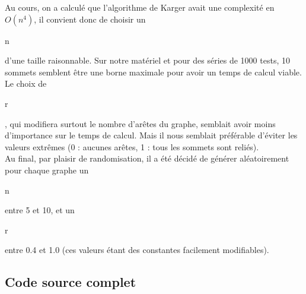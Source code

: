 \documentclass[a4paper,10pt]{article}
\begin{document}
Au cours, on a calculé que l'algorithme de Karger avait une complexité en \begin{math}O(n^{4})\end{math}, il convient donc de choisir un \begin{it}n\end{it} d'une taille raisonnable. Sur notre matériel et pour des séries de 1000 tests, 10 sommets semblent être une borne maximale pour avoir un temps de calcul viable.\\
Le choix de \begin{it}r\end{it}, qui modifiera surtout le nombre d'arêtes du graphe, semblait avoir moins d'importance sur le temps de calcul. Mais il nous semblait préférable d'éviter les valeurs extrêmes (0 : aucunes arêtes, 1 : tous les sommets sont reliés).\\
Au final, par plaisir de randomisation, il a été décidé de générer aléatoirement pour chaque graphe un \begin{it}n\end{it} entre 5 et 10, et un \begin{it}r\end{it} entre 0.4 et 1.0 (ces valeurs étant des constantes facilement modifiables).

\subsection{Code source complet}

\fontfamily{}
\end{document}
